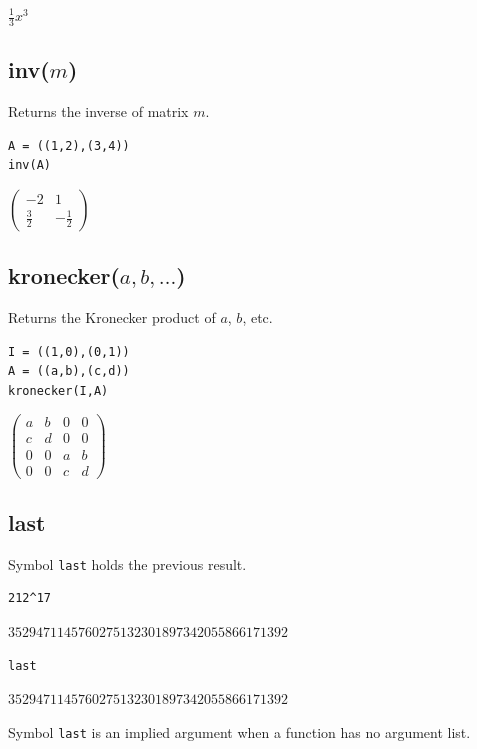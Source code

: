 \documentclass[12pt]{article}
\begin{document}
$\displaystyle \tfrac{1}{3}x^3$

\subsection*{inv($m$)}

Returns the inverse of matrix $m$.

{\color{blue}
\begin{verbatim}
A = ((1,2),(3,4))
inv(A)
\end{verbatim}
}

$\displaystyle
\begin{pmatrix}
-2 & 1
\\[1ex]
\tfrac{3}{2} & -\tfrac{1}{2}
\end{pmatrix}
$

\subsection*{kronecker($a,b,\ldots$)}

Returns the Kronecker product of $a$, $b$, etc.

{\color{blue}
\begin{verbatim}
I = ((1,0),(0,1))
A = ((a,b),(c,d))
kronecker(I,A)
\end{verbatim}
}

$\displaystyle
\begin{pmatrix}
a & b & 0 & 0
\\[1ex]
c & d & 0 & 0
\\[1ex]
0 & 0 & a & b
\\[1ex]
0 & 0 & c & d
\end{pmatrix}
$

\subsection*{last}

Symbol {\tt last} holds the previous result.

{\color{blue}
\begin{verbatim}
212^17
\end{verbatim}
}

$3529471145760275132301897342055866171392$

{\color{blue}
\begin{verbatim}
last
\end{verbatim}
}

$3529471145760275132301897342055866171392$

\bigskip
Symbol \verb$last$ is an implied argument when a function has no argument list.
\end{document}
